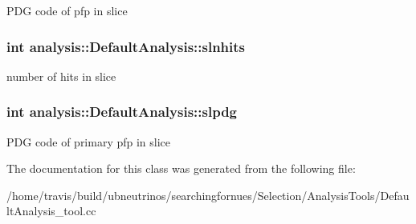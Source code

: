 P\-D\-G code of pfp in slice \hypertarget{classanalysis_1_1DefaultAnalysis_a9f003b22425d9db3b27eabee64700028}{
\subsubsection[{slnhits}]{\setlength{\rightskip}{0pt plus 5cm}int analysis\-::\-Default\-Analysis\-::slnhits\hspace{0.3cm}{\ttfamily [private]}}}\label{classanalysis_1_1DefaultAnalysis_a9f003b22425d9db3b27eabee64700028}
number of hits in slice \hypertarget{classanalysis_1_1DefaultAnalysis_a9763429d7ed32c67e96d981d14893c06}{
\subsubsection[{slpdg}]{\setlength{\rightskip}{0pt plus 5cm}int analysis\-::\-Default\-Analysis\-::slpdg\hspace{0.3cm}{\ttfamily [private]}}}\label{classanalysis_1_1DefaultAnalysis_a9763429d7ed32c67e96d981d14893c06}
P\-D\-G code of primary pfp in slice 

The documentation for this class was generated from the following file\-:\begin{DoxyCompactItemize}
\item 
/home/travis/build/ubneutrinos/searchingfornues/\-Selection/\-Analysis\-Tools/Default\-Analysis\-\_\-tool.\-cc\end{DoxyCompactItemize}
